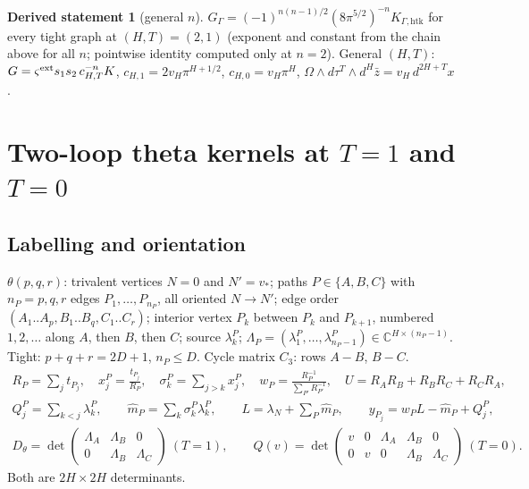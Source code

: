 \documentclass[10pt,a4paper]{article}
\numberwithin{equation}{section}
\theoremstyle{definition}
\newtheorem{dstatement}[theorem]{Derived statement}
\theoremstyle{remark}
\newcommand{\zb}{\bar z}
\newcommand{\htk}{\mathrm{htk}}
\begin{document}
\begin{dstatement}[general $n$]\label{ds-gen-n}
$G_\Gamma=(-1)^{n(n-1)/2}(8\pi^{5/2})^{-n}K_{\Gamma,\htk}$ for every tight graph at $(H,T)=(2,1)$ (exponent and constant from the chain above for all $n$; pointwise identity computed only at $n=2$). General $(H,T)$: $G=\varsigma^{\rm ext}s_1s_2\,c_{H,T}^{-n}K$, $c_{H,1}=2v_H\pi^{H+1/2}$, $c_{H,0}=v_H\pi^H$, $\Omega\wedge d\tau^T\wedge d^H\zb=v_H\,d^{2H+T}x$.
\end{dstatement}

\section{\texorpdfstring{Two-loop theta kernels at $T=1$ and $T=0$}{Two-loop theta kernels at T=1 and T=0}}\label{sec-theta}

\subsection{Labelling and orientation}\label{sec-theta-lab}
$\theta(p,q,r)$: trivalent vertices $N=0$ and $N'=v_*$; paths $P\in\{A,B,C\}$ with $n_P=p,q,r$ edges $P_1,\dots,P_{n_P}$, all oriented $N\to N'$; edge order $(A_1..A_p,B_1..B_q,C_1..C_r)$; interior vertex $P_k$ between $P_k$ and $P_{k+1}$, numbered $1,2,\dots$ along $A$, then $B$, then $C$; source $\lambda^P_k$; $\Lambda_P=(\lambda^P_1,\dots,\lambda^P_{n_P-1})\in\mathbb C^{H\times(n_P-1)}$. Tight: $p+q+r=2D+1$, $n_P\le D$. Cycle matrix $C_3$: rows $A-B$, $B-C$.
\begin{gather}
R_P=\sum_jt_{P_j},\quad x^P_j=\frac{t_{P_j}}{R_P},\quad \sigma^P_k=\sum_{j>k}x^P_j,\quad w_P=\frac{R_P^{-1}}{\sum_{P'}R_{P'}^{-1}},\quad U=R_AR_B+R_BR_C+R_CR_A,\\
Q^P_j=\sum_{k<j}\lambda^P_k,\qquad \hat m_P=\sum_k\sigma^P_k\lambda^P_k,\qquad L=\lambda_N+\sum_P\hat m_P,\qquad y_{P_j}=w_PL-\hat m_P+Q^P_j,\\
D_\theta=\det\begin{pmatrix}\Lambda_A&\Lambda_B&0\\0&\Lambda_B&\Lambda_C\end{pmatrix}\ (T=1),\qquad
Q(v)=\det\begin{pmatrix}v&0&\Lambda_A&\Lambda_B&0\\0&v&0&\Lambda_B&\Lambda_C\end{pmatrix}\ (T=0).
\end{gather}
Both are $2H\times2H$ determinants.
\end{document}
